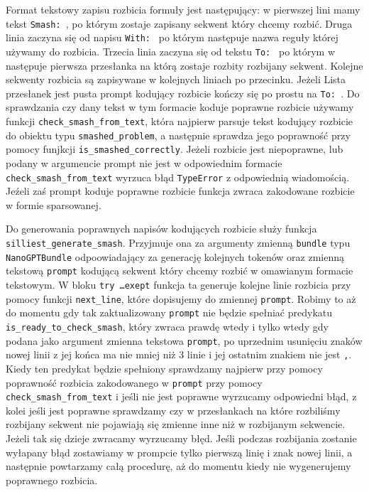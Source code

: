 \documentclass{article}
\begin{document}
Format tekstowy zapisu rozbicia formuły jest następujący: w pierwszej lini mamy tekst \texttt{Smash: }, po którym zostaje zapisany sekwent który chcemy rozbić. Druga linia zaczyna się od napisu \texttt{With: }
po którym następuje nazwa reguły której używamy do rozbicia. Trzecia linia zaczyna się od tekstu \texttt{To: } po którym w następuje pierwsza przesłanka na którą zostaje rozbity rozbijany sekwent. Kolejne sekwenty 
rozbicia są zapisywane w kolejnych liniach po przecinku. Jeżeli Lista przesłanek jest pusta prompt kodujący rozbicie kończy się po prostu na \texttt{To: }.  Do sprawdzania czy dany tekst w tym formacie koduje 
poprawne rozbicie używamy funkcji \texttt{check\_smash\_from\_text}, która najpierw parsuje tekst kodujący rozbicie do obiektu typu \texttt{smashed\_problem}, a następnie sprawdza jego poprawność przy pomocy funjkcji \texttt{is\_smashed\_correctly}.  Jeżeli rozbicie jest niepoprawne, lub podany w argumencie prompt nie jest w odpowiednim formacie \texttt{check\_smash\_from\_text} wyrzuca błąd \texttt{TypeError} z odpowiednią wiadomością. Jeźeli zaś prompt koduje poprawne rozbicie 
funkcja zwraca zakodowane rozbicie w formie sparsowanej.

Do generowania poprawnych napisów kodujących rozbicie służy funkcja \texttt{silliest\_generate\_smash}. Przyjmuje ona za argumenty zmienną \texttt{bundle} typu \texttt{NanoGPTBundle} odpoowiadający za generację kolejnych tokenów oraz zmienną tekstową \texttt{prompt} kodującą sekwent który chcemy rozbić w omawianym formacie tekstowym. W bloku \texttt{try \dots exept} funkcja ta generuje kolejne linie rozbicia przy pomocy funkcji \texttt{next\_line}, które dopisujemy do zmiennej \texttt{prompt}. Robimy to aż do momentu gdy tak zaktualizowany \texttt{prompt} nie będzie spełniać predykatu \texttt{is\_ready\_to\_check\_smash}, który zwraca prawdę wtedy i tylko wtedy gdy podana jako argument zmienna tekstowa \texttt{prompt}, po uprzednim usunięciu znaków nowej linii z jej końca ma nie mniej niż 3 linie i jej ostatnim znakiem nie jest \texttt{,}. Kiedy ten predykat będzie spełniony sprawdzamy najpierw przy pomocy poprawność rozbicia zakodowanego w \texttt{prompt} przy pomocy \texttt{check\_smash\_from\_text} i jeśli nie jest poprawne wyrzucamy odpowiedni błąd, z kolei jeśli jest poprawne sprawdzamy czy w przesłankach na które rozbiliśmy rozbijany sekwent nie pojawiają się zmienne inne niż w rozbijanym sekwencie. Jeżeli tak się dzieje zwracamy wyrzucamy błęd. Jeśli podczas rozbijania zostanie wyłapany błąd zostawiamy w prompcie tylko pierwszą linię i znak nowej linii, a następnie powtarzamy całą procedurę, aż do momentu kiedy nie wygenerujemy poprawnego rozbicia.
\end{document}
